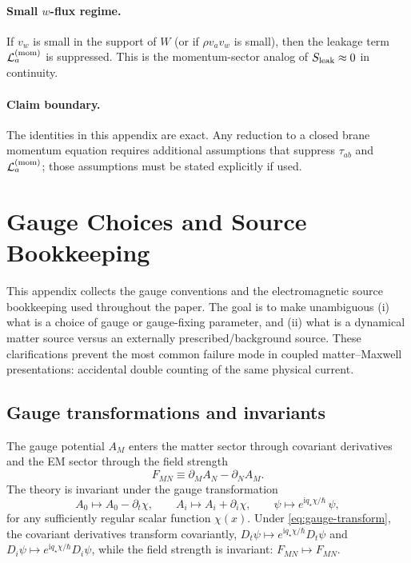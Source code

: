 \documentclass[11pt]{article}
\newcommand{\ii}{\mathrm{i}}
\newcommand{\qstar}{q_\star}
\begin{document}
\paragraph{Small $w$-flux regime.}
If $v_w$ is small in the support of $W$ (or if $\rho v_a v_w$ is small), then the leakage term $\mathcal{L}^{({\rm mom})}_a$ is suppressed. This is the momentum-sector analog of $S_{\rm leak}\approx 0$ in continuity.

\paragraph{Claim boundary.}
The identities in this appendix are exact. Any reduction to a closed brane momentum equation requires additional assumptions that suppress $\tau_{ab}$ and $\mathcal{L}^{({\rm mom})}_a$; those assumptions must be stated explicitly if used.

\section{Gauge Choices and Source Bookkeeping}
\label{app:gauge}

This appendix collects the gauge conventions and the electromagnetic source bookkeeping used throughout the paper. The goal is to make unambiguous (i) what is a choice of gauge or gauge-fixing parameter, and (ii) what is a dynamical matter source versus an externally prescribed/background source. These clarifications prevent the most common failure mode in coupled matter--Maxwell presentations: accidental double counting of the same physical current.

\subsection{Gauge transformations and invariants}
\label{app:gauge-transform}

The gauge potential $A_M$ enters the matter sector through covariant derivatives and the EM sector through the field strength
\begin{equation}
F_{MN} \equiv \partial_M A_N - \partial_N A_M.
\end{equation}
The theory is invariant under the gauge transformation
\begin{equation}
A_0 \mapsto A_0 - \partial_t \chi,
\qquad
A_i \mapsto A_i + \partial_i \chi,
\qquad
\psi \mapsto e^{\ii \qstar \chi/\hbar}\,\psi,
\label{eq:gauge-transform}
\end{equation}
for any sufficiently regular scalar function $\chi(x)$. Under \eqref{eq:gauge-transform}, the covariant derivatives transform covariantly, $D_t\psi \mapsto e^{\ii \qstar \chi/\hbar} D_t\psi$ and $D_i\psi \mapsto e^{\ii \qstar \chi/\hbar} D_i\psi$, while the field strength is invariant: $F_{MN}\mapsto F_{MN}$.
\end{document}
